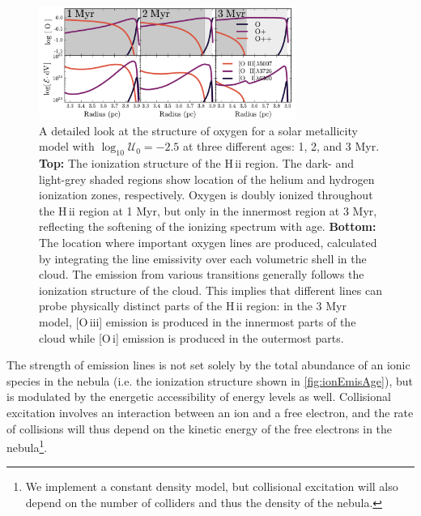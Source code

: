 \documentclass[linenumbers, trackchanges, tighten]{aastex61}%
\newcommand{\Fig}[1]{\autoref{fig:#1}}
\newcommand{\logten}{\ensuremath{\log_{10}}}
\newcommand{\oiii}{[O\,{\sc iii}]\xspace}
\newcommand{\oi}{[O\,{\sc i}]\xspace}
\newcommand{\hii}{H\,{\sc ii}\xspace}
\newcommand{\logU}{\ensuremath{\logten \mathcal{U}_0}}
\begin{document}
\begin{figure}[!htbp]
  \begin{centering}
    \includegraphics[width=0.75\textwidth]{f7.pdf}
    \caption{A detailed look at the structure of oxygen for a solar metallicity model with $\logU = -2.5$ at three different ages: 1, 2, and 3 Myr. \textbf{Top:} The ionization structure of the \hii region. The dark- and light-grey shaded regions show location of the helium and hydrogen ionization zones, respectively. Oxygen is doubly ionized throughout the \hii region at 1 Myr, but only in the innermost region at 3 Myr, reflecting the softening of the ionizing spectrum with age. \textbf{Bottom:} The location where important oxygen lines are produced, calculated by integrating the line emissivity over each volumetric shell in the cloud. The emission from various transitions generally follows the ionization structure of the cloud. This implies that different lines can probe physically distinct parts of the \hii region: in the 3 Myr model, \oiii{} emission is produced in the innermost parts of the cloud while \oi{} emission is produced in the outermost parts.}
    \label{fig:ionEmisAge}
  \end{centering}
\end{figure}

The strength of emission lines is not set solely by the total abundance of an ionic species in the nebula (i.e. the ionization structure shown in \Fig{ionEmisAge}), but is modulated by the energetic accessibility of energy levels as well. Collisional excitation involves an interaction between an ion and a free electron, and the rate of collisions will thus depend on the kinetic energy of the free electrons in the nebula\footnote{We implement a constant density model, but collisional excitation will also depend on the number of colliders and thus the density of the nebula.}.
\end{document}
